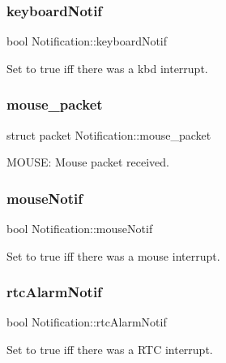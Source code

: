 \subsubsection{\texorpdfstring{keyboard\+Notif}{keyboardNotif}}
{\footnotesize\ttfamily bool Notification\+::keyboard\+Notif}



Set to true iff there was a kbd interrupt. 

\mbox{\label{group__interrupts_ga44ddd85ef55e76d85d28b611b892ee49}} 
\subsubsection{\texorpdfstring{mouse\+\_\+packet}{mouse\_packet}}
{\footnotesize\ttfamily struct packet Notification\+::mouse\+\_\+packet}



M\+O\+U\+SE\+: Mouse packet received. 

\mbox{\label{group__interrupts_ga033b89a1119cf0bf3dea6ba7d9ef1373}} 
\subsubsection{\texorpdfstring{mouse\+Notif}{mouseNotif}}
{\footnotesize\ttfamily bool Notification\+::mouse\+Notif}



Set to true iff there was a mouse interrupt. 

\mbox{\label{group__interrupts_ga429c938e843b61640cb0100efcef89da}} 
\subsubsection{\texorpdfstring{rtc\+Alarm\+Notif}{rtcAlarmNotif}}
{\footnotesize\ttfamily bool Notification\+::rtc\+Alarm\+Notif}



Set to true iff there was a R\+TC interrupt. 

